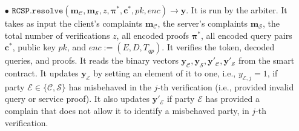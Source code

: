 \begin{definition}[RC-S-P Scheme]
\begin{itemize}

\


\item[$\bullet$] $\mathtt{RCSP}.\mathtt{resolve}(\bm{m}_{\scriptscriptstyle \mathcal{C}},\bm{m}_{\scriptscriptstyle \mathcal{S}},z, {\bm{\pi}}^{\scriptscriptstyle *}, {\bm{c}}^{\scriptscriptstyle *},pk,enc)\rightarrow \bm{y}$. It is run by the arbiter. It takes as input the client's complaints $\bm{m}_{\scriptscriptstyle \mathcal{C}}$, the server's complaints $\bm{m}_{\scriptscriptstyle \mathcal{S}}$, the total number of verifications $z$, all encoded proofs $ {\bm{\pi}}^{\scriptscriptstyle *}$, all encoded query pairs $ {\bm{c}}^{\scriptscriptstyle *}$, public key $pk$, and $enc:=(E,D,T_{\scriptscriptstyle qp})$.  It verifies the token, decoded queries, and proofs.  It reads the  binary vectors $\bm{y}_{\scriptscriptstyle \mathcal  C}, \bm{y}_{\scriptscriptstyle \mathcal  S},\bm{y}'_{\scriptscriptstyle \mathcal  C}, \bm{y}'_{\scriptscriptstyle \mathcal  S}$ from the smart contract. It  updates $\bm{y}_{\scriptscriptstyle \mathcal E}$ by setting an element of it to one, i.e., $y_{\scriptscriptstyle \mathcal E,j}=1$, if party $\mathcal{E}\in\{\mathcal{C},\mathcal{S}\}$ has misbehaved in the $j$-th verification (i.e., provided invalid query or service proof). It also updates $\bm{y}'_{\scriptscriptstyle \mathcal E}$ if party $\mathcal{E}$ has provided a complain that does not allow it to identify a misbehaved party, in $j$-th verification. 




\end{itemize}
\end{definition}
